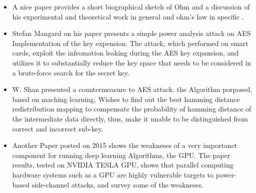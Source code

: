 \begin{itemize}
    \item A nice paper provides a short biographical sketch of Ohm and a discussion of his experimental and theoretical work in general and ohm's law in specific \cite{gupta1980georg}.
    \item Stefan Mangard on his paper \cite{mangard2002simple} presents a simple power analysis attack on AES Implementation of the key expension.
    The attack, which performed on smart cards, exploit the infromation leaking during the AES key expansion, 
    and utilizes it to substantially reduce the key space that needs to be considered in a brute-force search for the secret key.
    \item W. Shan \cite{shan2017machine} presented a countermeasure to AES attack. the Algorithm porposed, based
    on maching learning, Wishes to find out the best hamming distance redistribution mapping to compensate the probability of hamming distance of the intermediate data directly,
    thus, make it unable to be distinguished from correct and incorrect sub-key.
    \item Another Paper posted on 2015 \cite{luo2015side} shows the weakneses of a very importanct component for running deep learning Algorithms, the GPU.
    The paper results, tested on NVIDIA TESLA GPU, shows that parallel computing hardware systems such as a GPU are highly vulnerable targets to power-based side-channel attacks,
    and survey some of the weakneses.
\end{itemize}


   

